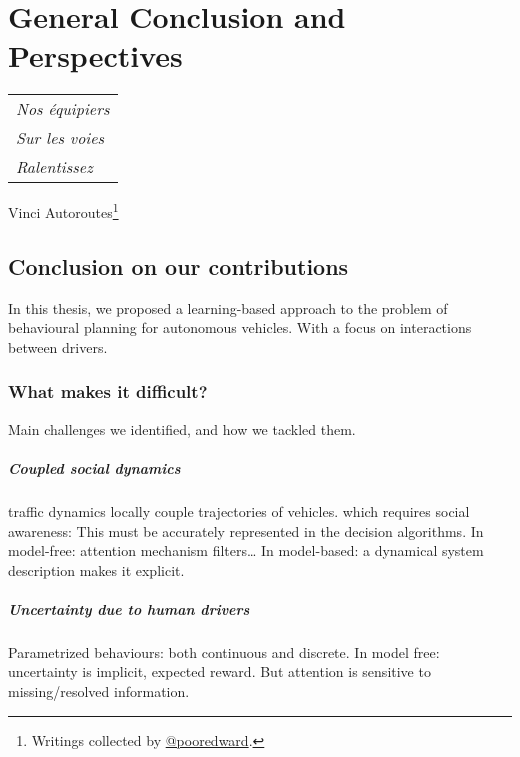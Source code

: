 
\chapter{General Conclusion and Perspectives}
\label{chapter:conclusion}

\begin{flushright}
	\begin{tabular}{@{}l@{}}
		\emph{Nos équipiers}\\
		\emph{\hspace*{1.0cm}Sur les voies}\\
		\emph{\hspace*{0.5cm}Ralentissez}\\
	\end{tabular}

	Vinci Autoroutes\footnote{Writings collected by \href{https://twitter.com/pooredward/status/1273249408231124994}
		{@pooredward}.}\hspace*{1cm}
\end{flushright}

\section{Conclusion on our contributions}
In this thesis, we proposed a learning-based approach to the problem of behavioural planning for autonomous vehicles. With a focus on interactions between drivers.

\subsection{What makes it difficult?}
Main challenges we identified, and how we tackled them.

\paragraph{Coupled social dynamics}
traffic dynamics locally couple trajectories of vehicles. which requires social awareness: This must be accurately represented in the decision algorithms.
In model-free: attention mechanism filters…
In model-based: a dynamical system description makes it explicit.

\paragraph{Uncertainty due to human drivers}
Parametrized behaviours: both continuous and discrete. In model free: uncertainty is implicit, expected reward. But attention is sensitive to missing/resolved information.

